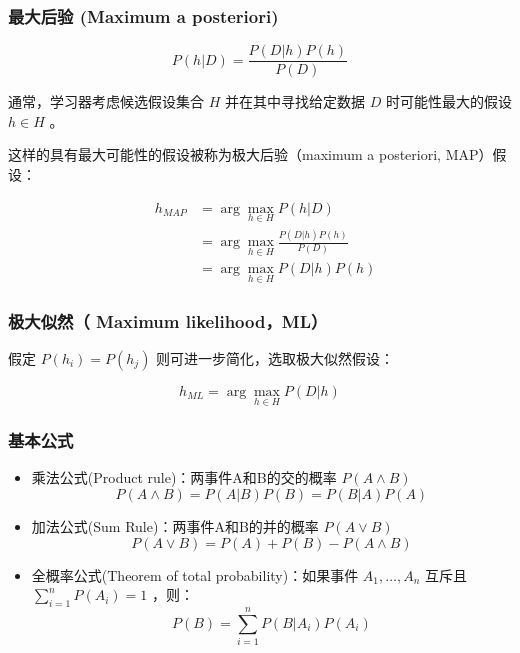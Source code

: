 \documentclass{beamer}
\begin{document}
\begin{frame}
\frametitle{最大后验 (Maximum a posteriori)}
\label{sec-1-3}


\[ P(h|D) = \frac{P(D|h) P(h)}{P(D)} \]

通常，学习器考虑候选假设集合 $H$ 并在其中寻找给定数据 $D$ 时可能性最大的假设 $h\in H$ 。

这样的具有最大可能性的假设被称为极大后验（maximum a posteriori, MAP）假设：

\begin{eqnarray}
& h_{MAP} & = \arg \max_{h \in H} P(h|D)\nonumber \\
& & = \arg \max_{h \in H} \frac{P(D|h) P(h)}{P(D)} \nonumber \\
& & = \arg \max_{h \in H}P(D|h) P(h) \nonumber
\end{eqnarray}
\end{frame}
\begin{frame}
\frametitle{极大似然（ Maximum likelihood，ML）}
\label{sec-1-4}


假定 $P(h_{i})=P(h_{j})$ 则可进一步简化，选取极大似然假设：

$$h_{ML}=\arg \max_{h \in H}P(D|h)$$
\end{frame}
\begin{frame}
\frametitle{基本公式}
\label{sec-1-5}


\begin{itemize}
\item 乘法公式(Product rule)：两事件A和B的交的概率 $P(A \land B)$
  $$P(A \land B) = P(A|B) P(B) = P(B|A) P(A)$$
\item 加法公式(Sum Rule)：两事件A和B的并的概率 $P(A\lor B)$
  $$P(A \lor B) = P(A) + P(B) - P(A \land B)$$
\item 全概率公式(Theorem of total probability)：如果事件 $A_{1}, \ldots, A_{n}$ 互斥且 $\sum_{i = 1}^{n} P(A_{i}) = 1$ ，则：
  $$P(B) = \sum_{i = 1}^{n} P(B|A_{i}) P(A_{i})$$
\end{itemize}
\end{frame}
\end{document}
